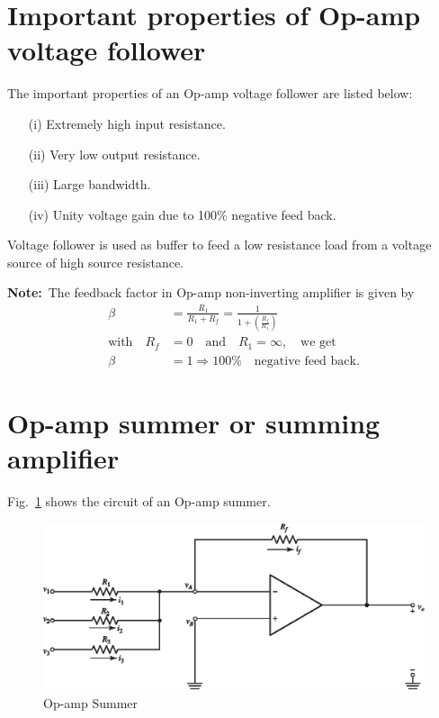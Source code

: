 \section{Important properties of Op-amp voltage follower}\label{sec5.12}

The important properties of an Op-amp voltage follower are listed below:
\begin{itemize}
\item[(i)] Extremely high input resistance.

\item[(ii)] Very low output resistance.

\item[(iii)] Large bandwidth.

\item[(iv)] Unity voltage gain due to 100\% negative feed back.
\end{itemize}


Voltage follower is used as buffer to feed a low resistance load from a voltage source of high source resistance.

\noindent
{\bf Note:}~The feedback factor in Op-amp non-inverting amplifier is given by
\begin{align*}
\beta &= \frac{R_{1}}{R_{1}+R_{f}}=\frac{1}{1+\left(\frac{R_{f}}{R_{1}}\right)}\\
\text{with}\quad R_{f} &=0 \text{~~ and~~ } R_{1}=\infty,\text{~~ we get}\\
\beta &= 1\Rightarrow 100\%\text{~~ negative feed back.}
\end{align*}

\section{Op-amp summer or summing amplifier}\label{sec5.13}

Fig.~\ref{fig5.14} shows the circuit of an Op-amp summer.
\begin{figure}[H]
\centering
\includegraphics{chap4/S3-EE-06-023.eps}
\caption{Op-amp Summer}\label{fig5.14}
\end{figure}

